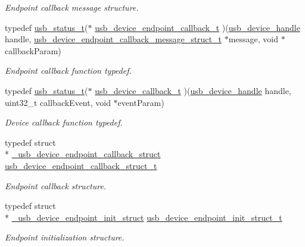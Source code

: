 \begin{DoxyCompactItemize}
\begin{DoxyCompactList}\small\item\em Endpoint callback message structure. \end{DoxyCompactList}\item 
typedef \hyperlink{group__usb__drv_ga3172b9f50553fb6d8aa2823d10a39c58}{usb\-\_\-status\-\_\-t}($\ast$ \hyperlink{group__usb__device__driver_gac780580992587eb809d445edcba7c3ca}{usb\-\_\-device\-\_\-endpoint\-\_\-callback\-\_\-t} )(\hyperlink{group__usb__drv_gae62132dc6e5eba994f8aa56cb7399abc}{usb\-\_\-device\-\_\-handle} handle, \hyperlink{group__usb__device__driver_ga291e21595b67e07488baad293f707e5f}{usb\-\_\-device\-\_\-endpoint\-\_\-callback\-\_\-message\-\_\-struct\-\_\-t} $\ast$message, void $\ast$callback\-Param)
\begin{DoxyCompactList}\small\item\em Endpoint callback function typedef. \end{DoxyCompactList}\item 
typedef \hyperlink{group__usb__drv_ga3172b9f50553fb6d8aa2823d10a39c58}{usb\-\_\-status\-\_\-t}($\ast$ \hyperlink{group__usb__device__driver_gac8ba48f1dea2c0b099092576ad48fb4e}{usb\-\_\-device\-\_\-callback\-\_\-t} )(\hyperlink{group__usb__drv_gae62132dc6e5eba994f8aa56cb7399abc}{usb\-\_\-device\-\_\-handle} handle, uint32\-\_\-t callback\-Event, void $\ast$event\-Param)
\begin{DoxyCompactList}\small\item\em Device callback function typedef. \end{DoxyCompactList}\item 
typedef struct \\*
\hyperlink{struct__usb__device__endpoint__callback__struct}{\-\_\-usb\-\_\-device\-\_\-endpoint\-\_\-callback\-\_\-struct} \hyperlink{group__usb__device__driver_ga0fcee893200ced24dbff370f38c16573}{usb\-\_\-device\-\_\-endpoint\-\_\-callback\-\_\-struct\-\_\-t}
\begin{DoxyCompactList}\small\item\em Endpoint callback structure. \end{DoxyCompactList}\item 
typedef struct \\*
\hyperlink{struct__usb__device__endpoint__init__struct}{\-\_\-usb\-\_\-device\-\_\-endpoint\-\_\-init\-\_\-struct} \hyperlink{group__usb__device__driver_ga5fd6342aa2c5f10ba177604031b38d99}{usb\-\_\-device\-\_\-endpoint\-\_\-init\-\_\-struct\-\_\-t}
\begin{DoxyCompactList}\small\item\em Endpoint initialization structure. \end{DoxyCompactList}\item 

\end{DoxyCompactItemize}
